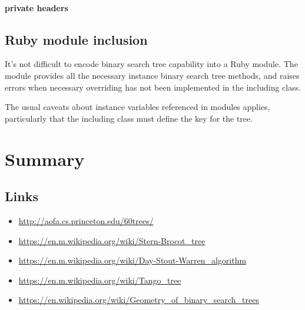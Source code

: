 \documentclass{article}
\begin{document}
\paragraph{private headers}

\subsection{Ruby module inclusion}

It's not difficult to encode binary search tree capability into a Ruby module.
The module provides all the necessary instance binary search tree methods, and
raises errors when necessary overriding has not been implemented in the
including class.

The usual caveats about instance variables referenced in modules applies,
particularly that the including class must define the key for the tree.

\section{Summary}


\subsection{Links}

\begin{itemize}
\item \href{http://aofa.cs.princeton.edu/60trees/}{http://aofa.cs.princeton.edu/60trees/}
\item \href{https://en.m.wikipedia.org/wiki/Stern-Brocot\_tree}{https://en.m.wikipedia.org/wiki/Stern-Brocot\_tree}
\item \href{https://en.m.wikipedia.org/wiki/Day-Stout-Warren\_algorithm}{%
https://en.m.wikipedia.org/wiki/Day-Stout-Warren\_algorithm}
\item \href{https://en.m.wikipedia.org/wiki/Tango\_tree}{https://en.m.wikipedia.org/wiki/Tango\_tree}
\item \href{https://en.wikipedia.org/wiki/Geometry\_of\_binary\_search\_trees}{%
https://en.wikipedia.org/wiki/Geometry\_of\_binary\_search\_trees}
\end{itemize}



{}

\end{document}
